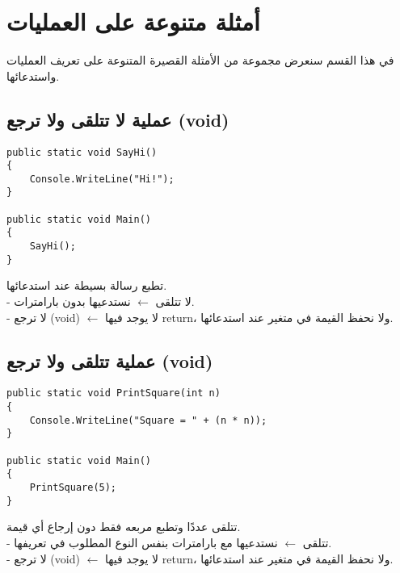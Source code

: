 \documentclass[12pt]{article}
\begin{document}
\clearpage
\section{أمثلة متنوعة على العمليات}

في هذا القسم سنعرض مجموعة من الأمثلة القصيرة المتنوعة على تعريف العمليات واستدعائها.

\subsection{عملية لا تتلقى ولا ترجع (\textenglish{void})}
\begin{boxExample}
\begin{english}
\begin{verbatim}
public static void SayHi()
{
    Console.WriteLine("Hi!");
}

public static void Main()
{
    SayHi();
}
\end{verbatim}
\end{english}
\end{boxExample}

تطبع رسالة بسيطة عند استدعائها. \\
- لا تتلقى $\leftarrow$ نستدعيها بدون بارامترات. \\
- لا ترجع (\textenglish{void}) $\leftarrow$ لا يوجد فيها \textenglish{return}، ولا نحفظ القيمة في متغير عند استدعائها.

\subsection{عملية تتلقى ولا ترجع (\textenglish{void})}
\begin{boxExample}
\begin{english}
\begin{verbatim}
public static void PrintSquare(int n)
{
    Console.WriteLine("Square = " + (n * n));
}

public static void Main()
{
    PrintSquare(5);
}
\end{verbatim}
\end{english}
\end{boxExample}

تتلقى عددًا وتطبع مربعه فقط دون إرجاع أي قيمة. \\
- تتلقى $\leftarrow$ نستدعيها مع بارامترات بنفس النوع المطلوب في تعريفها. \\
- لا ترجع (\textenglish{void}) $\leftarrow$ لا يوجد فيها \textenglish{return}، ولا نحفظ القيمة في متغير عند استدعائها.
\end{document}
